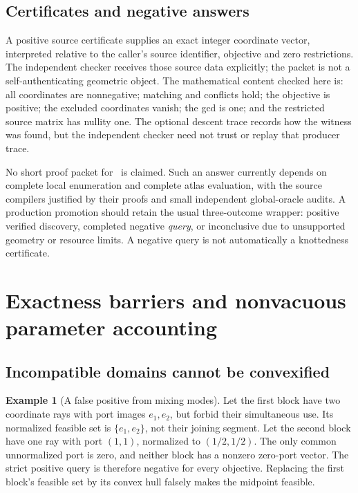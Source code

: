 \documentclass[11pt,a4paper]{article}
\theoremstyle{definition}
\newtheorem{example}[theorem]{Example}
\theoremstyle{remark}
\begin{document}
\subsection{Certificates and negative answers}
A positive source certificate supplies an exact integer coordinate vector, interpreted relative to the caller's source identifier, objective and zero restrictions. The independent checker receives those source data explicitly; the packet is not a self-authenticating geometric object. The mathematical content checked here is: all coordinates are nonnegative; matching and conflicts hold; the objective is positive; the excluded coordinates vanish; the gcd is one; and the restricted source matrix has nullity one. The optional descent trace records how the witness was found, but the independent checker need not trust or replay that producer trace.

No short proof packet for \nonpos\ is claimed. Such an answer currently depends on complete local enumeration and complete atlas evaluation, with the source compilers justified by their proofs and small independent global-oracle audits. A production promotion should retain the usual three-outcome wrapper: positive verified discovery, completed negative \emph{query}, or inconclusive due to unsupported geometry or resource limits. A negative query is not automatically a knottedness certificate.



\section{Exactness barriers and nonvacuous parameter accounting}
\label{sec:barriers}

\subsection{Incompatible domains cannot be convexified}
\begin{example}[A false positive from mixing modes]
\label{ex:convex}
Let the first block have two coordinate rays with port images $e_1,e_2$, but forbid their simultaneous use. Its normalized feasible set is $\{e_1,e_2\}$, not their joining segment. Let the second block have one ray with port $(1,1)$, normalized to $(1/2,1/2)$. The only common unnormalized port is zero, and neither block has a nonzero zero-port vector. The strict positive query is therefore negative for every objective. Replacing the first block's feasible set by its convex hull falsely makes the midpoint feasible.
\end{example}
\end{document}
